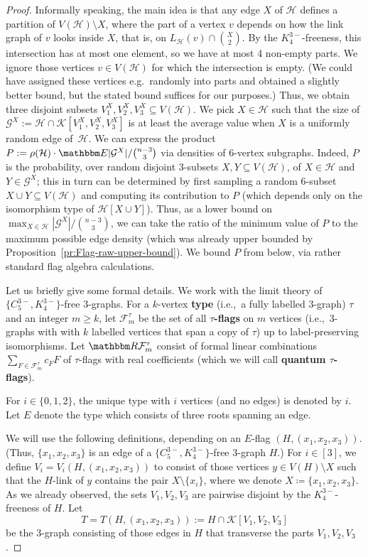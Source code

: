 \documentclass[11pt,a4paper]{article}
\theoremstyle{remark}
\newcommand{\C}[1]{\mathcal{#1}}
\newcommand{\I}[1]{{\mathbbm #1}}
\begin{document}
\begin{proof} 
Informally speaking, the main idea is that any edge $X$ of  $\C H$ defines a partition of $V(\C H)\setminus X$, where the part of a vertex $v$ depends on how the link graph of $v$ looks inside $X$, that is, on $L_{\C H}(v)\cap {X\choose 2}$. By the $K_{4}^{3-}$-freeness, this intersection has at most one element, so we have at most 4 non-empty parts. We ignore those vertices $v\in V(\C H)$ for which the intersection is empty. (We could have assigned these vertices e.g.\ randomly into parts and obtained a slightly better bound, but the stated bound suffices for our purposes.) Thus, we obtain three disjoint subsets $V_1^X,V_2^X,V_3^X\subseteq V(\C H)$. We pick $X\in\C H$ such that the size of $\C G^X:=\C H\cap \C K[V_1^X,V_2^X,V_3^X]$ is at least the average value when $X$ is a uniformly random edge of~$\C H$. We can express the product $P:=\rho(\C H)\cdot \I E|\C G^X|/{n-3\choose 3}$ via densities of $6$-vertex subgraphs. Indeed, $P$ is the probability, over random disjoint $3$-subsets $X,Y\subseteq V(\C H)$, of $X\in\C H$ and $Y\in\C G^X$; this in turn can be determined by first sampling a random 6-subset $X\cup Y\subseteq V(\C H)$ and computing its contribution to $P$ (which depends only on the isomorphism type of $\C H[X\cup Y]$). Thus, as a lower bound on $\max_{X\in\C H} |\C G^X|/{n-3\choose 3}$, we can take the ratio of the minimum value of $P$ to the maximum possible edge density (which was already  upper bounded by Proposition~\ref{pr:Flag-raw-upper-bound}). 
We bound $P$ from below,  via rather standard flag algebra calculations.


Let us briefly give some formal details. We work with the limit theory of $\{C_{5}^{3-}, K_{4}^{3-}\}$-free $3$-graphs. For a $k$-vertex \textbf{type} (i.e.,\ a fully labelled 3-graph) $\tau$ and an integer $m\ge k$, let $\C F_m^\tau$ be the set of all \textbf{$\tau$-flags} on $m$ vertices (i.e.,\ $3$-graphs with with $k$ labelled vertices that span a copy of $\tau$) up to label-preserving isomorphisms. Let $\I R\C F_m^\tau$ consist of  formal linear combinations $\sum_{F\in \C F_m^\tau} c_F F$ of $\tau$-flags with real coefficients (which we will call \textbf{quantum $\tau$-flags}).

For $i\in \{0,1,2\}$, the unique type with $i$ vertices (and no edges) is denoted by $i$. Let $E$ denote the type which consists of three roots spanning an edge.

We will use the following definitions, depending on an $E$-flag $(H, (x_1,x_2,x_3))$. (Thus, $\{x_1,x_2,x_3\}$ is an edge of a $\{C_{5}^{3-},K_{4}^{3-}\}$-free $3$-graph $H$.) For $i\in[3]$, we define $V_i=V_i(H, (x_1,x_2,x_3))$ to consist of those vertices $y\in V(H)\setminus X$ such that  the $H$-link of $y$ contains the pair $X\setminus\{x_i\}$, where we denote $X\coloneqq \{x_1,x_2,x_3\}$. As we already observed,  the sets $V_1,V_2,V_3$ are pairwise disjoint by the $K_{4}^{3-}$-freeness of $H$. Let 
$$
T=T(H, (x_1,x_2,x_3)) := H\cap \C K[V_1,V_2,V_3]
$$ be the 3-graph consisting of those edges in $H$ that transverse the parts $V_1,V_2,V_3$.



\end{proof}
\end{document}
